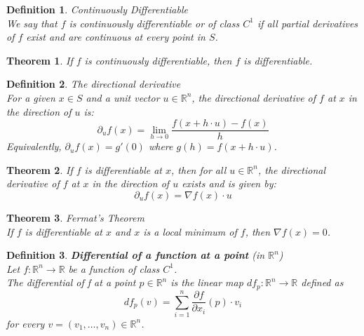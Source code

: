 \documentclass[11pt]{book} %
\newtheorem{theorem}{Theorem}[section]
\newtheorem{definition}{Definition}[section]
\begin{document}
\begin{definition}{Continuously Differentiable} \\
We say that $f$ is continuously differentiable or of class $C^1$  if all partial derivatives of $f$ exist and are continuous at every point in $S$.
\end{definition}

\bigbreak

\begin{theorem}
If $f$ is continuously differentiable, then $f$ is differentiable.
\end{theorem}

\bigbreak

\begin{definition}{The directional derivative} \\
For a given $x \in S$ and a unit vector $u \in \mathbb{R}^n$, the directional derivative of $f$ at $x$ in the direction of $u$ is:
\begin{equation}
    \partial_u f(x) = \lim_{h \rightarrow 0} \frac{f(x + h \cdot u) - f(x)}{h}
\end{equation}
Equivalently, $\partial_u f(x) = g'(0)$ where $g(h) = f(x + h \cdot u)$.
\end{definition}

\bigbreak

\begin{theorem}
If $f$ is differentiable at $x$, then for all $u \in \mathbb{R}^n$, the directional derivative of $f$ at $x$ in the direction of $u$ exists and is given by:
\begin{equation}
    \partial_u f(x) = \nabla f(x) \cdot u
\end{equation}
\end{theorem}

\bigbreak

\begin{theorem}{Fermat's Theorem} \\
If $f$ is differentiable at $x$ and $x$ is a local minimum of $f$, then $\nabla f(x) = 0$.
\end{theorem}

\bigbreak

\begin{definition}{\textbf{Differential of a function at a point} (in $\mathbb{R}^n$)} \\
    Let \( f: \mathbb{R}^n \to \mathbb{R} \) be a function of class \( C^1 \). \\
    The differential of f at a point \( p \in \mathbb{R}^n \) is the linear map \( df_p : \mathbb{R}^n \to \mathbb{R} \) defined as
    \begin{equation*}
        df_p(v) = \sum_{i=1}^{n} \frac{\partial f}{\partial x_i}(p) \cdot v_i
    \end{equation*}
    for every \( v = (v_1, \ldots, v_n) \in \mathbb{R}^n \).
\end{definition}
\end{document}
